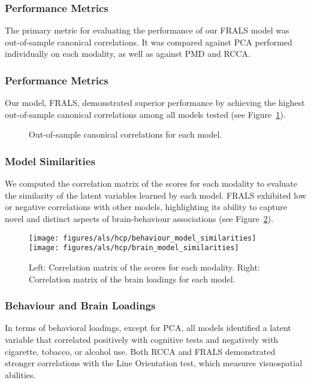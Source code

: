 \subsubsection{Performance Metrics}
The primary metric for evaluating the performance of our FRALS model was out-of-sample canonical correlations.
It was compared against PCA performed individually on each modality, as well as against PMD and RCCA\@.

\subsubsection{Performance Metrics}
Our model, FRALS, demonstrated superior performance by achieving the highest out-of-sample canonical correlations among all models tested (see Figure~\ref{fig:performance}).

\begin{figure}[h]
\centering

\caption{Out-of-sample canonical correlations for each model.}
\label{fig:performance}
\end{figure}

\subsubsection{Model Similarities}
We computed the correlation matrix of the scores for each modality to evaluate the similarity of the latent variables learned by each model.
FRALS exhibited low or negative correlations with other models, highlighting its ability to capture novel and distinct aspects of brain-behaviour associations (see Figure~\ref{fig:similarities}).

\begin{figure}[h]
\centering
\texttt{[image: figures/als/hcp/behaviour\_model\_similarities]}
\texttt{[image: figures/als/hcp/brain\_model\_similarities]}
\caption{Left: Correlation matrix of the scores for each modality. Right: Correlation matrix of the brain loadings for each model.}
\label{fig:similarities}
\end{figure}


\subsubsection{Behaviour and Brain Loadings}
In terms of behavioral loadings, except for PCA, all models identified a latent variable that correlated positively with cognitive tests and negatively with cigarette, tobacco, or alcohol use.
Both RCCA and FRALS demonstrated stronger correlations with the Line Orientation test, which measures visuospatial abilities.

